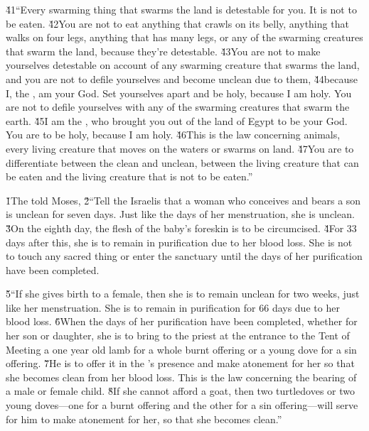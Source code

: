 \v{41}``Every swarming thing that swarms the land is detestable for you. It is not to be eaten. \v{42}You are not to eat anything that crawls on its belly, anything that walks on four legs, anything that has many legs, or any of the swarming creatures that swarm the land, because they're detestable. \v{43}You are not to make yourselves detestable on account of any swarming creature that swarms the land, and you are not to defile yourselves and become unclean due to them, \v{44}because I, the , am your God. Set yourselves apart and be holy, because I am holy. You are not to defile yourselves with any of the swarming creatures that swarm the earth. \v{45}I am the , who brought you out of the land of Egypt to be your God. You are to be holy, because I am holy. \v{46}This is the law concerning animals, every living creature that moves on the waters or swarms on land. \v{47}You are to differentiate between the clean and unclean, between the living creature that can be eaten and the living creature that is not to be eaten.''

\v{1}The  told Moses, \v{2}``Tell the Israelis that a woman who conceives and bears a son is unclean for seven days. Just like the days of her menstruation, she is unclean. \v{3}On the eighth day, the flesh of the baby's foreskin is to be circumcised. \v{4}For 33 days after this, she is to remain in purification due to her blood loss. She is not to touch any sacred thing or enter the sanctuary until the days of her purification have been completed.

\v{5}``If she gives birth to a female, then she is to remain unclean for two weeks, just like her menstruation. She is to remain in purification for 66 days due to her blood loss. \v{6}When the days of her purification have been completed, whether for her son or daughter, she is to bring to the priest at the entrance to the Tent of Meeting a one year old lamb for a whole burnt offering or a young dove for a sin offering. \v{7}He is to offer it in the 's presence and make atonement for her so that she becomes clean from her blood loss. This is the law concerning the bearing of a male or female child. \v{8}If she cannot afford a goat, then two turtledoves or two young doves---one for a burnt offering and the other for a sin offering---will serve for him to make atonement for her, so that she becomes clean.''

